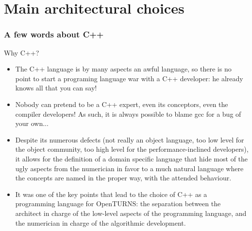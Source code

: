\documentclass[8pt]{beamer}
\begin{document}
\section[Main architectural choices]{Main architectural choices}
\begin{frame}
  \frametitle{A few words about C++}
  \begin{block}{Why C++?}
    \begin{itemize}
    \item \alert{The C++ language is by many aspects an awful language}, so there is no point to start a programing language war with a C++ developer: he already knows all that you can say!
    \item Nobody can pretend to be a C++ expert, even its conceptors, even the compiler developers! As such, it is always possible to blame gcc for a bug of your own...
    \item Despite its numerous defects (not really an object language, too low level for the object community, too high level for the performance-inclined developers), it allows for the definition of a \alert{domain specific language} that hide most of the ugly aspects from the numerician in favor to a much natural language where the concepts are named in the proper way, with the attended behaviour.
    \item It was one of the key points that lead to the choice of C++ as a programming language for OpenTURNS: the separation between the architect in charge of the low-level aspects of the programming language, and the numerician in charge of the algorithmic development.
    \end{itemize}
  \end{block}
\end{frame}
\end{document}
